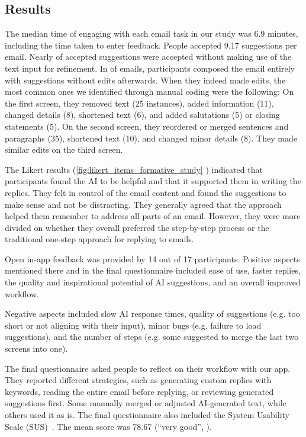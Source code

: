 \subsection{Results}\label{sec:formative_study_results}
The median time of engaging with each email task in our study was 6.9 minutes, including the time taken to enter feedback. 
People accepted 9.17 suggestions per email.
Nearly  of accepted suggestions were accepted without making use of the text input for refinement. %
In  of emails, participants composed the email entirely with suggestions without edits afterwards.
When they indeed made edits, the most common ones we identified through manual coding were the following: On the first screen, they removed text (25 instances), added information (11), changed details (8), shortened text (6), and added salutations (5) or closing statements (5). 
On the second screen, they reordered or merged sentences and paragraphs (35), shortened text (10), and changed minor details (8). 
They made similar edits on the third screen. %





The Likert results (\cref{fig:likert_items_formative_study} ) indicated that participants found the AI to be helpful and that it supported them in writing the replies. They felt in control of the email content and found the suggestions to make sense and not be distracting. They generally agreed that the approach helped them remember to address all parts of an email. However, they were more divided on whether they overall preferred the step-by-step process or the traditional one-step approach for replying to emails.

Open in-app feedback was provided by 14 out of 17 participants. Positive aspects mentioned there and in the final questionnaire included ease of use, faster replies, the quality and inspirational potential of AI suggestions, and an overall improved workflow. 

Negative aspects included slow AI response times, quality of suggestions (e.g. too short or not aligning with their input), minor bugs (e.g. failure to load suggestions), and the number of steps (e.g. some suggested to merge the last two screens into one).  

The final questionnaire asked people to reflect on their workflow with our app. They reported different strategies, such as generating custom replies with keywords, reading the entire email before replying, or reviewing generated suggestions first. Some manually merged or adjusted AI-generated text, while others used it as is. 
The final questionnaire also included the System Usability Scale (SUS)~\cite{brooke1996sus}. The mean score was 78.67 (``very good'', ).












